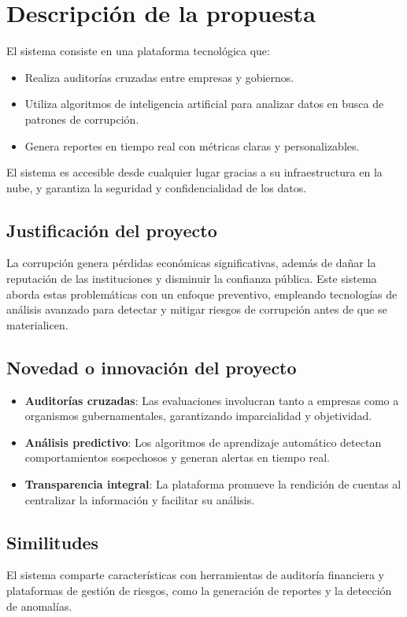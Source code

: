 \documentclass[a4paper,12pt]{article}
\begin{document}
\section{Descripción de la propuesta}
El sistema consiste en una plataforma tecnológica que:
\begin{itemize}
    \item Realiza auditorías cruzadas entre empresas y gobiernos.
    \item Utiliza algoritmos de inteligencia artificial para analizar datos en busca de patrones de corrupción.
    \item Genera reportes en tiempo real con métricas claras y personalizables.
\end{itemize}
El sistema es accesible desde cualquier lugar gracias a su infraestructura en la nube, y garantiza la seguridad y confidencialidad de los datos.

\subsection{Justificación del proyecto}
La corrupción genera pérdidas económicas significativas, además de dañar la reputación de las instituciones y disminuir la confianza pública. Este sistema aborda estas problemáticas con un enfoque preventivo, empleando tecnologías de análisis avanzado para detectar y mitigar riesgos de corrupción antes de que se materialicen.

\subsection{Novedad o innovación del proyecto}
\begin{itemize}
    \item \textbf{Auditorías cruzadas}: Las evaluaciones involucran tanto a empresas como a organismos gubernamentales, garantizando imparcialidad y objetividad.
    \item \textbf{Análisis predictivo}: Los algoritmos de aprendizaje automático detectan comportamientos sospechosos y generan alertas en tiempo real.
    \item \textbf{Transparencia integral}: La plataforma promueve la rendición de cuentas al centralizar la información y facilitar su análisis.
\end{itemize}

\subsection{Similitudes}
El sistema comparte características con herramientas de auditoría financiera y plataformas de gestión de riesgos, como la generación de reportes y la detección de anomalías.
\end{document}
